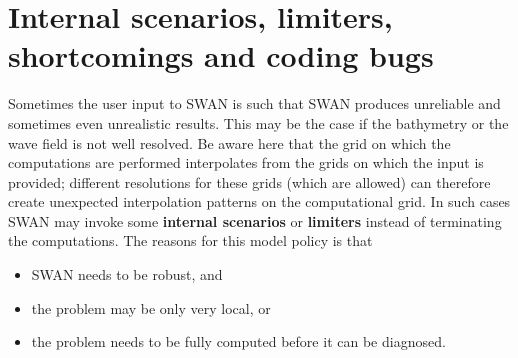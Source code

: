 \documentclass[12pt]{book}
\begin{document}
\section{Internal scenarios, limiters, shortcomings and coding bugs}

Sometimes the user input to SWAN is such that SWAN produces unreliable and sometimes even
unrealistic results. This may be the case if the bathymetry or the wave field is not well resolved. Be aware
here that the grid on which the computations are performed interpolates from the grids on which the input
is provided; different resolutions for these grids (which are allowed) can therefore create unexpected
interpolation patterns on the computational grid. In such cases SWAN may invoke some {\bf internal
scenarios} or {\bf limiters} instead of terminating the computations. The reasons for this model policy is that
\begin{itemize}
  \item SWAN needs to be robust, and
  \item the problem may be only very local, or
  \item the problem needs to be fully computed before it can be diagnosed.
\end{itemize}
\end{document}
